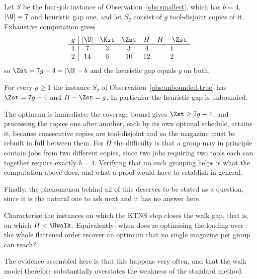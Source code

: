 \begin{observation}\label{obs:unbounded-true}
Let $S$ be the four-job instance of Observation~\ref{obs:smallest}, which has $b=4$,
$\lvert\U\rvert=7$ and heuristic gap one, and let $S_g$ consist of $g$ tool-disjoint
copies of it. Exhaustive computation gives
\[
  \begin{array}{c|ccccc}
   g & \lvert\U\rvert & \Kst & \Zst & H & H-\Zst\\\hline
   1 & 7  & 3 & 3  & 4  & 1\\
   2 & 14 & 6 & 10 & 12 & 2
  \end{array}
\]
so $\Zst=7g-4=\lvert\U\rvert-b$ and the heuristic gap equals $g$ on both.
\end{observation}

\begin{conjecture}\label{conj:unbounded}
For every $g\ge1$ the instance $S_g$ of Observation~\ref{obs:unbounded-true} has
$\Zst=7g-4$ and $H-\Zst=g$. In particular the heuristic gap is unbounded.
\end{conjecture}

\begin{support}
The optimum is immediate: the coverage bound gives $\Zst\ge7g-4$, and processing the
copies one after another, each by its own optimal schedule, attains it, because
consecutive copies are tool-disjoint and so the magazine must be rebuilt in full
between them. For $H$ the difficulty is that a group may in principle contain jobs
from two different copies, since two jobs requiring two tools each can together
require exactly $b=4$. Verifying that no such grouping helps is what the computation
above does, and what a proof would have to establish in general.
\end{support}

Finally, the phenomenon behind all of this deserves to be stated as a question, since
it is the natural one to ask next and it has no answer here.

\begin{problem}\label{prob:ktns-closes}
Characterise the instances on which the KTNS step closes the walk gap, that is, on
which $H<\Hwalk$. Equivalently: when does re-optimising the loading over the whole
flattened order recover an optimum that no single magazine per group can reach?
\end{problem}

The evidence assembled here is that this happens very often, and that the walk model
therefore substantially overstates the weakness of the standard method.

